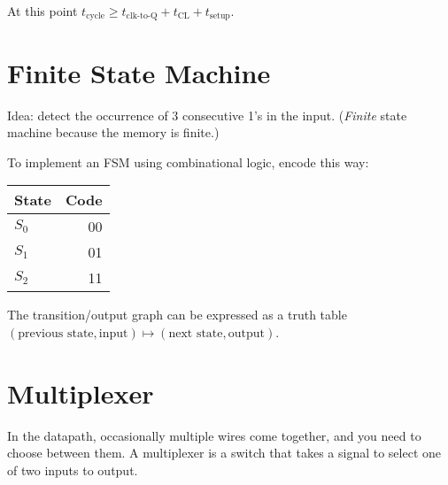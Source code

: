 At this point \(t_\text{cycle}\ge t_\text{clk-to-Q} + t_\text{CL} + t_\text{setup}\).

\section{Finite State Machine}
Idea: detect the occurrence of 3 consecutive 1's in the input. (\emph{Finite} state machine because the memory is finite.)

To implement an FSM using combinational logic, encode this way:

\begin{tabular}{lr}
	State & Code \\\hline
	\(S_0\) & 00 \\
	\(S_1\) & 01 \\
	\(S_2\) & 11
\end{tabular}

The transition/output graph can be expressed as a truth table \(\left(\text{previous state}, \text{input}\right)\mapsto\left(\text{next state}, \text{output}\right)\).

\section{Multiplexer}
In the datapath, occasionally multiple wires come together, and you need to choose between them. A multiplexer is a switch that takes a signal to select one of two inputs to output.